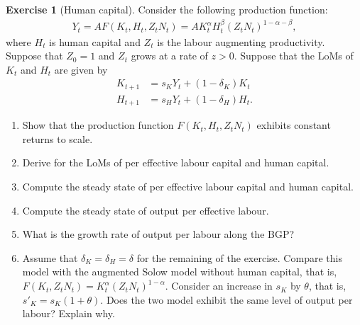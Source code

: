 \documentclass{book}
\theoremstyle{definition}
\newtheorem{exercise}{Exercise}[chapter]
\theoremstyle{plain}
\begin{document}
\begin{exercise}[Human capital]
    Consider the following production function:
    \begin{align*}
        Y_t = A F(K_t, H_t, Z_tN_t) = A K_t^{\alpha} H_t^{\beta} (Z_tN_t)^{1-\alpha-\beta},
    \end{align*}
    where $H_t$ is human capital and $Z_t$ is the labour augmenting productivity. Suppose that $Z_0 = 1$ and $Z_t$ grows at a rate of $z>0$. Suppose that the LoMs of $K_t$ and $H_t$ are given by
    \begin{align*}
        K_{t+1} &= s_K Y_t + (1-\delta_K)K_t\\
        H_{t+1} &= s_H Y_t + (1-\delta_H)H_t.
    \end{align*}
    \begin{enumerate}[label=(\arabic*)]
        \item Show that the production function $F(K_t, H_t, Z_t N_t)$ exhibits constant returns to scale.
        \item Derive for the LoMs of per effective labour capital and human capital.
        \item Compute the steady state of per effective labour capital and human capital.
        \item Compute the steady state of output per effective labour.
        \item What is the growth rate of output per labour along the BGP?
        \item Assume that $\delta_K = \delta_H = \delta$ for the remaining of the exercise. Compare this model with the augmented Solow model without human capital, that is, $F(K_t, Z_t N_t) = K_t^{\alpha} (Z_t N_t)^{1-\alpha}$. Consider an increase in $s_K$ by $\theta$, that is, $s'_K = s_K (1+\theta)$. Does the two model exhibit the same {\color{red}level} of output per labour? Explain why.
    \end{enumerate}
\end{exercise}
\end{document}
